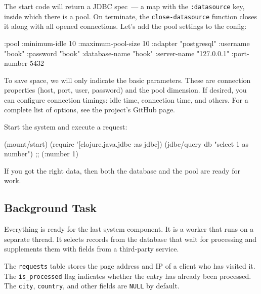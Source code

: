 The start code will return a JDBC spec~--- a map with the \verb|:datasource| key, inside which there is a pool. On terminate, the \verb|close-datasource| function closes it along with all opened connections. Let's add the pool settings to the config:

\begin{english}
  \begin{clojure}
{:pool {:minimum-idle       10
        :maximum-pool-size  10
        :adapter            "postgresql"
        :username           "book"
        :password           "book"
        :database-name      "book"
        :server-name        "127.0.0.1"
        :port-number        5432}}
  \end{clojure}
\end{english}

To save space, we will only indicate the basic parameters. These are connection properties (host, port, user, password) and the pool dimension. If desired, you can configure connection timings: idle time, connection time, and others. For a complete list of options, see the project's GitHub page.

Start the system and execute a request:

\begin{english}
  \begin{clojure}
(mount/start)
(require '[clojure.java.jdbc :as jdbc])
(jdbc/query db "select 1 as number")
;; ({:number 1})
  \end{clojure}
\end{english}

If you got the right data, then both the database and the pool are ready for work.

\subsection{Background Task}

\label{worker}

Everything is ready for the last system component. It is a worker that runs on a separate thread. It selects records from the database that wait for processing and supplements them with fields from a third-party service.

The \verb|requests| table stores the page address and IP of a client who has visited it. The \verb|is_processed| flag indicates whether the entry has already been processed. The \verb|city|, \verb|country|, and other fields are \verb|NULL| by default.


